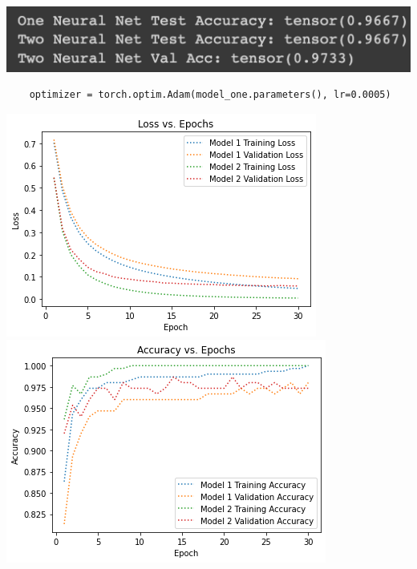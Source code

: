 \documentclass[11pt]{article}
\begin{document}
\begin{center}
    \includegraphics[scale=0.3]{4l-3.png} \\
\end{center}

\begin{lstlisting}
    optimizer = torch.optim.Adam(model_one.parameters(), lr=0.0005)
\end{lstlisting}

\begin{center}
    \includegraphics[scale=0.6]{4l-1.png} \\
    \includegraphics[scale=0.6]{4l-2.png} \\
\end{center}
\end{document}
